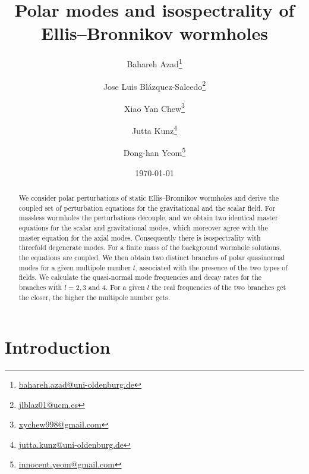 \documentclass[a4paper,12pt]{article}
\begin{document}
\title{Polar modes {and isospectrality} of Ellis--Bronnikov wormholes}
%
\author[1]{Bahareh Azad\thanks{\href{mailto:bahareh.azad@uni-oldenburg.de}{bahareh.azad@uni-oldenburg.de}}}
\author[2]{Jose Luis Bl\'azquez-Salcedo\thanks{\href{mailto:jlblaz01@ucm.es}{jlblaz01@ucm.es}}}
\author[3,4]{Xiao Yan Chew\thanks{\href{mailto:xychew998@gmail.com}{xychew998@gmail.com}}}
\author[1]{Jutta Kunz\thanks{\href{mailto:jutta.kunz@uni-oldenburg.de}{jutta.kunz@uni-oldenburg.de}}} 
\author[3,4]{Dong-han Yeom\thanks{\href{mailto:innocent.yeom@gmail.com}{innocent.yeom@gmail.com}}}

\date{\today}

\maketitle

\begin{abstract}
We consider polar perturbations of static Ellis--Bronnikov wormholes and derive the coupled set of perturbation equations for the gravitational and the scalar field. 
For massless wormholes the perturbations decouple, and we obtain two identical master equations for the scalar and gravitational modes, which moreover agree with the master equation for the axial modes.
Consequently there is isospectrality with threefold degenerate modes.
{For a finite} mass of the background wormhole solutions, the equations are coupled. We then obtain two distinct branches of polar quasinormal modes for a given multipole number $l$, associated with the presence of the two types of fields.
We calculate the quasi-normal mode frequencies and decay rates for the branches with $l=2, 3$ and 4.  
For a given $l$ the real frequencies of the two branches get the closer, the higher the multipole number gets.
\end{abstract}





\section{Introduction}
\end{document}
